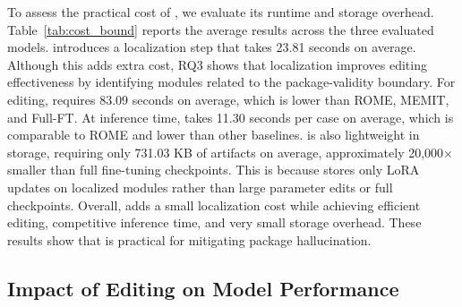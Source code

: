 To assess the practical cost of \appname, we evaluate its runtime and storage overhead. 
Table~\ref{tab:cost_bound} reports the average results across the three evaluated models. 
\appname introduces a localization step that takes 23.81 seconds on average. 
Although this adds extra cost, RQ3 shows that localization improves editing effectiveness by identifying modules related to the package-validity boundary.
For editing, \appname requires 83.09 seconds on average, which is lower than ROME, MEMIT, and Full-FT. 
At inference time, \appname takes 11.30 seconds per case on average, which is comparable to ROME and lower than other baselines. 
\appname is also lightweight in storage, requiring only 731.03 KB of artifacts on average, approximately 20,000× smaller than full fine-tuning checkpoints. This is because \appname stores only LoRA updates on localized modules rather than large parameter edits or full checkpoints. 
Overall, \appname adds a small localization cost while achieving efficient editing, competitive inference time, and very small storage overhead.
These results show that \appname is practical for mitigating package hallucination.

\subsection{Impact of Editing on Model Performance}
\begin{table}[t]
\centering
\captionsetup{skip=2pt}
\caption{Code accuracy on HumanEval before and after editing.}
\label{tab:editing_drop}
\footnotesize
\setlength{\tabcolsep}{3pt}
\renewcommand{\arraystretch}{0.95}
\vspace{-0.3cm}
\end{table}

